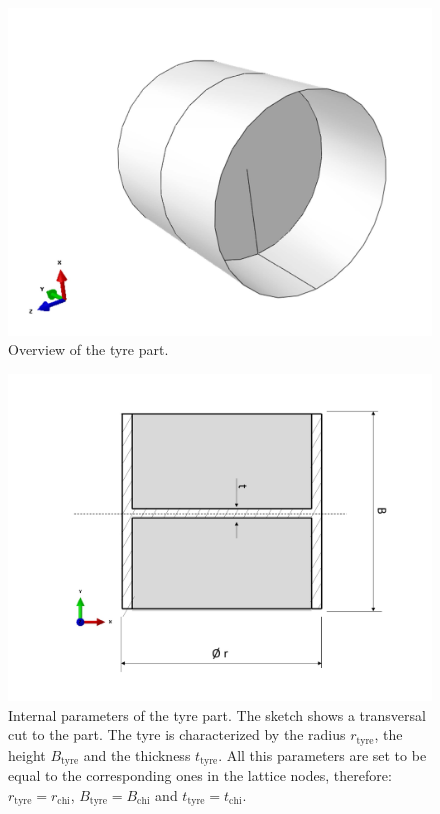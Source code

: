     \begin{figure}[!htpb]
      \centering
      \includegraphics[width=0.6 \textwidth]{figures/model/tyre-part}
      \caption[Overview of the tyre part]{Overview of the tyre part.}\label{fig:tyre-part}
    \end{figure}

    \begin{figure}[!htpb]
      \centering
      \includegraphics[width=0.8 \textwidth]{figures/model/tyre-internalParameters}
      \caption[Internal parameters of the tyre part]{Internal parameters of the tyre part. The sketch shows a transversal cut to the part. The tyre is characterized by the radius $r_{\mathrm{tyre}}$, the height $B_{\mathrm{tyre}}$ and the thickness $t_{\mathrm{tyre}}$. All this parameters are set to be equal to the corresponding ones in the lattice nodes, therefore: $r_{\mathrm{tyre}} = r_{\mathrm{chi}}$, $B_{\mathrm{tyre}} = B_{\mathrm{chi}}$ and $t_{\mathrm{tyre}} = t_{\mathrm{chi}}$.}\label{fig:tyre-internalParameters}
    \end{figure}

